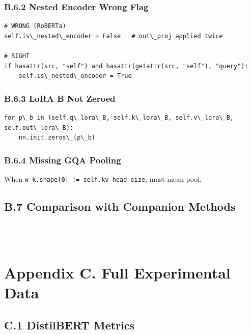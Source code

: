 \subsubsection{B.6.2 Nested Encoder Wrong Flag}

\begin{lstlisting}
# WRONG (RoBERTa)
self.is\_nested\_encoder = False   # out\_proj applied twice

# RIGHT
if hasattr(src, "self") and hasattr(getattr(src, "self"), "query"):
    self.is\_nested\_encoder = True
\end{lstlisting}

\subsubsection{B.6.3 LoRA B Not Zeroed}

\begin{lstlisting}
for p\_b in (self.q\_lora\_B, self.k\_lora\_B, self.v\_lora\_B, self.out\_lora\_B):
    nn.init.zeros\_(p\_b)
\end{lstlisting}

\subsubsection{B.6.4 Missing GQA Pooling}

When \texttt{w\_k.shape[0] != self.kv\_head\_size}, must mean-pool.

\subsection{B.7 Comparison with Companion Methods}

\begin{lstlisting}

---
\end{lstlisting}


\section{Appendix C. Full Experimental Data}

\subsection{C.1 DistilBERT Metrics}


